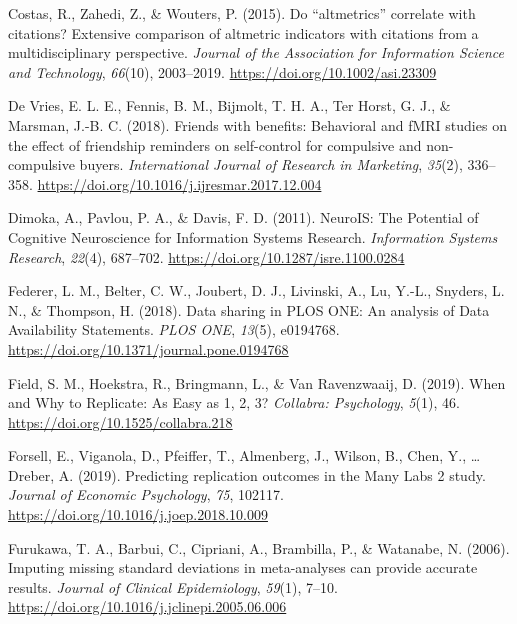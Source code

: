 \documentclass[
  man,floatsintext]{apa6}
\newlength{\cslhangindent}
\newlength{\cslentryspacingunit} %
\newenvironment{CSLReferences}[2] %
 {%
  \setlength{\parindent}{0pt}
  \ifodd #1
  \let\oldpar\par
  \def\par{\hangindent=\cslhangindent\oldpar}
  \fi
  \setlength{\parskip}{#2\cslentryspacingunit}
 }%
 {}
\begin{document}
\begin{CSLReferences}{1}{0}
\leavevmode{}%
Costas, R., Zahedi, Z., \& Wouters, P. (2015). Do {``altmetrics''} correlate with citations? {Extensive} comparison of altmetric indicators with citations from a multidisciplinary perspective. \emph{Journal of the Association for Information Science and Technology}, \emph{66}(10), 2003--2019. \url{https://doi.org/10.1002/asi.23309}

\leavevmode{}%
De Vries, E. L. E., Fennis, B. M., Bijmolt, T. H. A., Ter Horst, G. J., \& Marsman, J.-B. C. (2018). Friends with benefits: {Behavioral} and {fMRI} studies on the effect of friendship reminders on self-control for compulsive and non-compulsive buyers. \emph{International Journal of Research in Marketing}, \emph{35}(2), 336--358. \url{https://doi.org/10.1016/j.ijresmar.2017.12.004}

\leavevmode{}%
Dimoka, A., Pavlou, P. A., \& Davis, F. D. (2011). {NeuroIS}: {The Potential} of {Cognitive Neuroscience} for {Information Systems Research}. \emph{Information Systems Research}, \emph{22}(4), 687--702. \url{https://doi.org/10.1287/isre.1100.0284}

\leavevmode{}%
Federer, L. M., Belter, C. W., Joubert, D. J., Livinski, A., Lu, Y.-L., Snyders, L. N., \& Thompson, H. (2018). Data sharing in {PLOS ONE}: {An} analysis of {Data Availability Statements}. \emph{PLOS ONE}, \emph{13}(5), e0194768. \url{https://doi.org/10.1371/journal.pone.0194768}

\leavevmode{}%
Field, S. M., Hoekstra, R., Bringmann, L., \& Van Ravenzwaaij, D. (2019). When and {Why} to {Replicate}: {As Easy} as 1, 2, 3? \emph{Collabra: Psychology}, \emph{5}(1), 46. \url{https://doi.org/10.1525/collabra.218}

\leavevmode{}%
Forsell, E., Viganola, D., Pfeiffer, T., Almenberg, J., Wilson, B., Chen, Y., \ldots{} Dreber, A. (2019). Predicting replication outcomes in the {Many Labs} 2 study. \emph{Journal of Economic Psychology}, \emph{75}, 102117. \url{https://doi.org/10.1016/j.joep.2018.10.009}

\leavevmode{}%
Furukawa, T. A., Barbui, C., Cipriani, A., Brambilla, P., \& Watanabe, N. (2006). Imputing missing standard deviations in meta-analyses can provide accurate results. \emph{Journal of Clinical Epidemiology}, \emph{59}(1), 7--10. \url{https://doi.org/10.1016/j.jclinepi.2005.06.006}


\end{CSLReferences}
\end{document}

